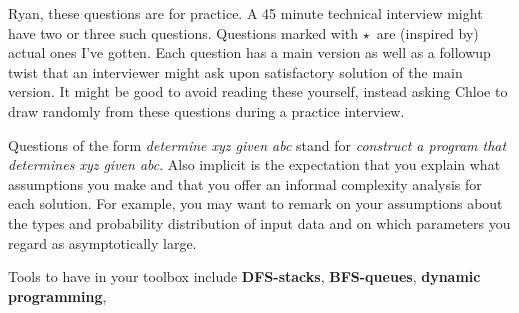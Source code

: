 \documentclass{article}
\newcommand{\real}{{\color{red!75}$\star$\ }}
\begin{document}
    Ryan, these questions are for practice.  A 45 minute technical interview
    might have two or three such questions.  Questions marked with \real are
    (inspired by) actual ones I've gotten.  Each question has a main version as
    well as a followup twist that an interviewer might ask upon satisfactory
    solution of the main version.  It might be good to avoid reading these
    yourself, instead asking Chloe to draw randomly from these questions during
    a practice interview.

    Questions of the form \emph{determine xyz given abc} stand for
    \emph{construct a program that determines xyz given abc}.  Also implicit is
    the expectation that you explain what assumptions you make and that you
    offer an informal complexity analysis for each solution.  For example, you
    may want to remark on your assumptions about the types and probability
    distribution of input data and on which parameters you regard as
    asymptotically large.


    Tools to have in your toolbox include 
    \textbf{DFS-stacks},
    \textbf{BFS-queues},
    \textbf{dynamic programming},
\end{document}
